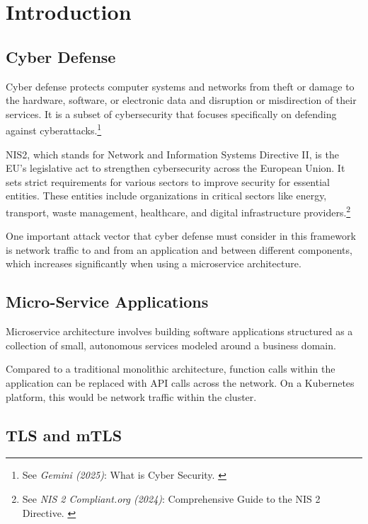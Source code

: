 %
%

\pagebreak
\section{Introduction}

\onehalfspacing

\subsection{Cyber Defense}

Cyber defense protects computer systems and networks from theft or damage to the hardware, software, or electronic data and disruption or misdirection of their services. It is a subset of cybersecurity that focuses specifically on defending against cyberattacks.\footnote{See \textit{Gemini (2025)}: What is Cyber Security. \cite{bardCybersec}}

NIS2, which stands for Network and Information Systems Directive II, is the EU's legislative act to strengthen cybersecurity across the European Union. It sets strict requirements for various sectors to improve security for essential entities. These entities include organizations in critical sectors like energy, transport, waste management, healthcare, and digital infrastructure providers.\footnote{See \textit{NIS 2 Compliant.org (2024)}: Comprehensive Guide to the NIS 2 Directive. \cite{nisGuide}}

One important attack vector that cyber defense must consider in this framework is network traffic to and from an application and between different components, which increases significantly when using a microservice architecture.

\subsection{Micro-Service Applications}

Microservice architecture involves building software applications structured as a collection of small, autonomous services modeled around a business domain.

Compared to a traditional monolithic architecture, function calls within the application can be replaced with API calls across the network. On a Kubernetes platform, this would be network traffic within the cluster.

\subsection{TLS and mTLS}

